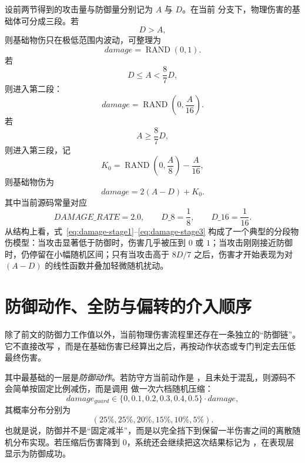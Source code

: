 设前两节得到的攻击量与防御量分别记为 $A$ 与 $D$。在当前  分支下，物理伤害的基础体可分成三段。若
\begin{equation}
    D > A,
\end{equation}
则基础物伤只在极低范围内波动，可整理为
\begin{equation}
    damage = \operatorname{RAND}(0,1).
    \label{eq:damage-stage1}
\end{equation}
若
\begin{equation}
    D \le A < \frac{8}{7}D,
\end{equation}
则进入第二段：
\begin{equation}
    damage = \operatorname{RAND}\left(0,\frac{A}{16}\right).
    \label{eq:damage-stage2}
\end{equation}
若
\begin{equation}
    A \ge \frac{8}{7}D,
\end{equation}
则进入第三段，记
\begin{equation}
    K_0 = \operatorname{RAND}\left(0,\frac{A}{8}\right)-\frac{A}{16},
\end{equation}
则基础物伤为
\begin{equation}
    damage = 2(A-D)+K_0.
    \label{eq:damage-stage3}
\end{equation}
其中当前源码常量对应
\begin{equation}
    DAMAGE\_RATE=2.0, \qquad D\_8=\frac{1}{8}, \qquad D\_{16}=\frac{1}{16}.
\end{equation}
从结构上看，式~\eqref{eq:damage-stage1}--\eqref{eq:damage-stage3} 构成了一个典型的分段物伤模型：当攻击显著低于防御时，伤害几乎被压到 $0$ 或 $1$；当攻击刚刚接近防御时，仍停留在小幅随机区间；只有当攻击高于 $8D/7$ 之后，伤害才开始表现为对 $(A-D)$ 的线性函数并叠加轻微随机扰动。

\section{防御动作、全防与偏转的介入顺序}

除了前文的防御力工作值以外，当前物理伤害流程里还存在一条独立的“防御链”。它不直接改写 ，而是在基础伤害已经算出之后，再按动作状态或专门判定去压低最终伤害。

其中最基础的一层是\emph{防御动作}。若防守方当前动作是 ，且未处于混乱，则源码不会简单按固定比例减伤，而是调用  做一次六档随机压缩：
\begin{equation}
    damage_{guard} \in \{0,0.1,0.2,0.3,0.4,0.5\}\cdot damage,
\end{equation}
其概率分布分别为
\begin{equation}
    (25\%,25\%,20\%,15\%,10\%,5\%).
\end{equation}
也就是说，防御并不是“固定减半”，而是以完全挡下到保留一半伤害之间的离散随机分布实现。若压缩后伤害降到 $0$，系统还会继续把这次结果标记为 ，在表现层显示为防御成功。


